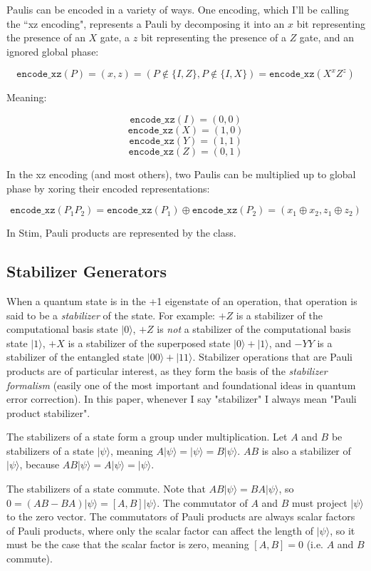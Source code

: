 \documentclass[onecolumn,unpublished]{quantumarticle}
\theoremstyle{definition}
\theoremstyle{definition}
\theoremstyle{definition}
\begin{document}
Paulis can be encoded in a variety of ways.
One encoding, which I'll be calling the ``xz encoding", represents a Pauli by decomposing it into an $x$ bit representing the presence of an $X$ gate, a $z$ bit representing the presence of a $Z$ gate, and an ignored global phase:

$$\texttt{encode\_xz}(P) = (x, z) = (P \notin \{I, Z\}, P \notin \{I, X\}) = \texttt{encode\_xz}(X^x Z^z)$$

Meaning:

$$\texttt{encode\_xz}(I) = (0, 0)$$
$$\texttt{encode\_xz}(X) = (1, 0)$$
$$\texttt{encode\_xz}(Y) = (1, 1)$$
$$\texttt{encode\_xz}(Z) = (0, 1)$$

In the xz encoding (and most others), two Paulis can be multiplied up to global phase by xoring their encoded representations:

$$\texttt{encode\_xz}(P_1 P_2) = \texttt{encode\_xz}(P_1) \oplus \texttt{encode\_xz}(P_2) = (x_1 \oplus x_2, z_1 \oplus z_2)$$

In Stim, Pauli products are represented by the  class.

\subsection{Stabilizer Generators}

When a quantum state is in the +1 eigenstate of an operation, that operation is said to be a {\em stabilizer} of the state.
For example: $+Z$ is a stabilizer of the computational basis state $|0\rangle$, $+Z$ is {\em not} a stabilizer of the computational basis state $|1\rangle$, $+X$ is a stabilizer of the superposed state $|0\rangle + |1\rangle$, and $-YY$ is a stabilizer of the entangled state $|00\rangle + |11\rangle$.
Stabilizer operations that are Pauli products are of particular interest, as they form the basis of the {\em stabilizer formalism} \cite{gottesman1997stabilizerformalism} (easily one of the most important and foundational ideas in quantum error correction).
In this paper, whenever I say "stabilizer" I always mean "Pauli product stabilizer".

The stabilizers of a state form a group under multiplication.
Let $A$ and $B$ be stabilizers of a state $|\psi\rangle$, meaning $A |\psi\rangle = |\psi\rangle = B |\psi\rangle$.
$AB$ is also a stabilizer of $|\psi\rangle$, because $A B|\psi\rangle = A |\psi\rangle = |\psi\rangle$.

The stabilizers of a state commute.
Note that $A B|\psi\rangle = B A|\psi\rangle$, so $0 = (AB - BA) |\psi\rangle = [A, B] |\psi\rangle$.
The commutator of $A$ and $B$ must project $|\psi\rangle$ to the zero vector.
The commutators of Pauli products are always scalar factors of Pauli products, where only the scalar factor can affect the length of $|\psi\rangle$, so it must be the case that the scalar factor is zero, meaning $[A, B] = 0$ (i.e. $A$ and $B$ commute).
\end{document}
